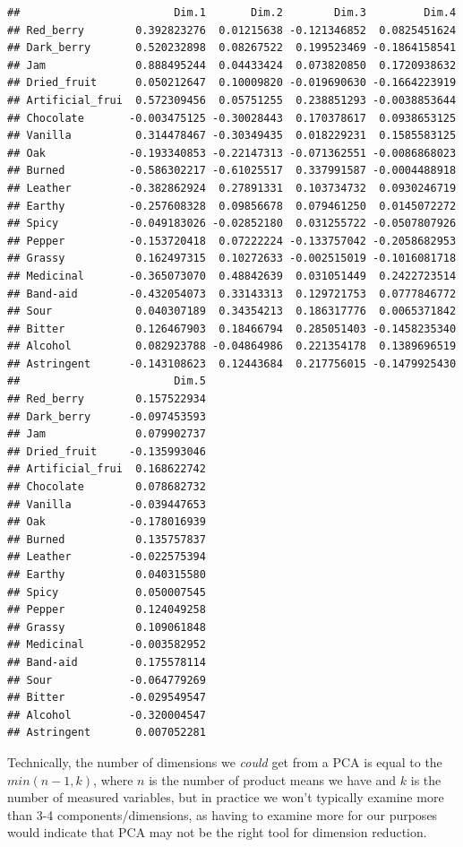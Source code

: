 \documentclass[
]{book}
\begin{document}
\begin{verbatim}
##                        Dim.1       Dim.2        Dim.3         Dim.4
## Red_berry        0.392823276  0.01215638 -0.121346852  0.0825451624
## Dark_berry       0.520232898  0.08267522  0.199523469 -0.1864158541
## Jam              0.888495244  0.04433424  0.073820850  0.1720938632
## Dried_fruit      0.050212647  0.10009820 -0.019690630 -0.1664223919
## Artificial_frui  0.572309456  0.05751255  0.238851293 -0.0038853644
## Chocolate       -0.003475125 -0.30028443  0.170378617  0.0938653125
## Vanilla          0.314478467 -0.30349435  0.018229231  0.1585583125
## Oak             -0.193340853 -0.22147313 -0.071362551 -0.0086868023
## Burned          -0.586302217 -0.61025517  0.337991587 -0.0004488918
## Leather         -0.382862924  0.27891331  0.103734732  0.0930246719
## Earthy          -0.257608328  0.09856678  0.079461250  0.0145072272
## Spicy           -0.049183026 -0.02852180  0.031255722 -0.0507807926
## Pepper          -0.153720418  0.07222224 -0.133757042 -0.2058682953
## Grassy           0.162497315  0.10272633 -0.002515019 -0.1016081718
## Medicinal       -0.365073070  0.48842639  0.031051449  0.2422723514
## Band-aid        -0.432054073  0.33143313  0.129721753  0.0777846772
## Sour             0.040307189  0.34354213  0.186317776  0.0065371842
## Bitter           0.126467903  0.18466794  0.285051403 -0.1458235340
## Alcohol          0.082923788 -0.04864986  0.221354178  0.1389696519
## Astringent      -0.143108623  0.12443684  0.217756015 -0.1479925430
##                        Dim.5
## Red_berry        0.157522934
## Dark_berry      -0.097453593
## Jam              0.079902737
## Dried_fruit     -0.135993046
## Artificial_frui  0.168622742
## Chocolate        0.078682732
## Vanilla         -0.039447653
## Oak             -0.178016939
## Burned           0.135757837
## Leather         -0.022575394
## Earthy           0.040315580
## Spicy            0.050007545
## Pepper           0.124049258
## Grassy           0.109061848
## Medicinal       -0.003582952
## Band-aid         0.175578114
## Sour            -0.064779269
## Bitter          -0.029549547
## Alcohol         -0.320004547
## Astringent       0.007052281
\end{verbatim}

Technically, the number of dimensions we \emph{could} get from a PCA is equal to the \(min(n-1, k)\), where \(n\) is the number of product means we have and \(k\) is the number of measured variables, but in practice we won't typically examine more than 3-4 components/dimensions, as having to examine more for our purposes would indicate that PCA may not be the right tool for dimension reduction.
\end{document}
